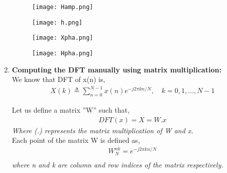 \documentclass[journal,12pt,twocolumn]{IEEEtran}
\renewcommand\thesection{\arabic{section}}
\begin{document}
\begin{enumerate}[label=\thesection.\arabic*.,ref=\thesection.\theenumi]
\begin{figure}[h!]
    \centering
    \texttt{[image: Hamp.png]}
    \label{figs}
\end{figure}

\begin{figure}[h!]
    \centering
    \texttt{[image: h.png]}
    \label{figs}
\end{figure}
\vspace{1cm}
\begin{figure}[h!]
    \centering
    \texttt{[image: Xpha.png]}
    \label{figs}
\end{figure}

\begin{figure}[h!]
    \centering
    \texttt{[image: Hpha.png]}
    \label{figs}
\end{figure}


\newpage
\item
{ \bf Computing the DFT manually using matrix multiplication:} \\

We know that DFT of x(n) is, \\
\begin{align}
    X(k) \triangleq \sum_{n=0}^{N-1}x(n)e^{-j2\pi kn/N},\quad k=0,1, \ldots, N-1 
\end{align}

Let us define a matrix ''W'' such that, 
\begin{align}
    DFT(x)= X = W.x  \label{eq:dftx}
\end{align}
\emph {Where (.) represents the matrix multiplication of W and x.} \\
Each point of the matrix W is defined as, \\
\begin{align}
    W_N^{nk}=e^{-j2\pi kn/N} \\
\end{align}
\emph{where n and k are column and row indices of the matrix respectively.} \\


\end{enumerate}
\end{document}
